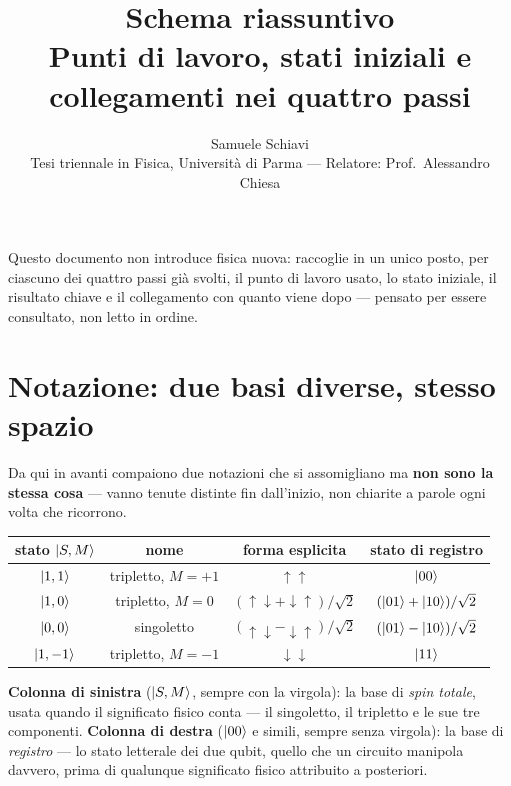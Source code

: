 \documentclass[11pt,a4paper]{article}
\title{\bfseries Schema riassuntivo\\[2pt]
\large Punti di lavoro, stati iniziali e collegamenti nei quattro passi}
\author{Samuele Schiavi \\ \small Tesi triennale in Fisica, Università di Parma
--- Relatore: Prof.\ Alessandro Chiesa}
\date{}
\begin{document}
\maketitle
\thispagestyle{fancy}

Questo documento non introduce fisica nuova: raccoglie in un unico posto,
per ciascuno dei quattro passi già svolti, il punto di lavoro usato, lo
stato iniziale, il risultato chiave e il collegamento con quanto viene
dopo --- pensato per essere consultato, non letto in ordine.

\section*{Notazione: due basi diverse, stesso spazio}

Da qui in avanti compaiono due notazioni che si assomigliano ma
\textbf{non sono la stessa cosa} --- vanno tenute distinte fin dall'inizio,
non chiarite a parole ogni volta che ricorrono.

\begin{center}
\renewcommand{\arraystretch}{1.5}
\begin{tabular}{@{}cccc@{}}
\toprule
\rowcolor{grigetto}
\textbf{stato $\lvert S,M\rangle$} & \textbf{nome} & \textbf{forma esplicita} & \textbf{stato di registro} \\
\midrule
$\lvert 1,1\rangle$ & tripletto, $M{=}{+}1$ & $\uparrow\uparrow$ & $\lvert 00\rangle$ \\
$\lvert 1,0\rangle$ & tripletto, $M{=}0$ & $(\uparrow\downarrow+\downarrow\uparrow)/\sqrt2$ & $(\lvert 01\rangle+\lvert 10\rangle)/\sqrt2$ \\
$\lvert 0,0\rangle$ & singoletto & $(\uparrow\downarrow-\downarrow\uparrow)/\sqrt2$ & $(\lvert 01\rangle-\lvert 10\rangle)/\sqrt2$ \\
$\lvert 1,-1\rangle$ & tripletto, $M{=}{-}1$ & $\downarrow\downarrow$ & $\lvert 11\rangle$ \\
\bottomrule
\end{tabular}
\end{center}

\textbf{Colonna di sinistra} ($\lvert S,M\rangle$, sempre con la virgola): la base
di \emph{spin totale}, usata quando il significato fisico conta --- il
singoletto, il tripletto e le sue tre componenti.
\textbf{Colonna di destra} ($\lvert 00\rangle$ e simili, sempre senza virgola): la
base di \emph{registro} --- lo stato letterale dei due qubit, quello che
un circuito manipola davvero, prima di qualunque significato fisico
attribuito a posteriori.

\end{document}
